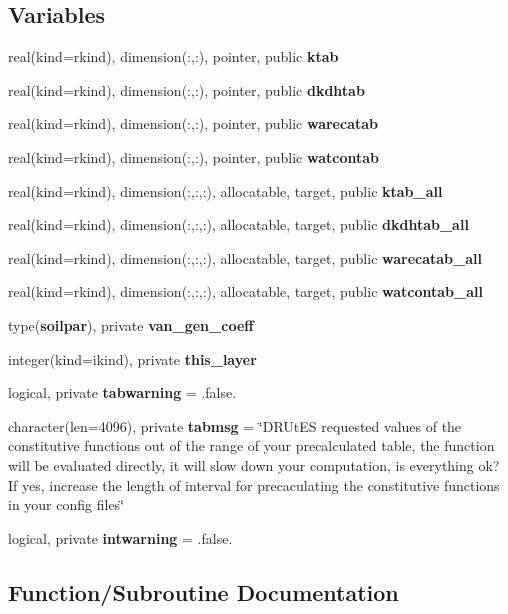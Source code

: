 \subsection*{Variables}
\begin{DoxyCompactItemize}
\item 
real(kind=rkind), dimension(\+:,\+:), pointer, public {\bf ktab}
\item 
real(kind=rkind), dimension(\+:,\+:), pointer, public {\bf dkdhtab}
\item 
real(kind=rkind), dimension(\+:,\+:), pointer, public {\bf warecatab}
\item 
real(kind=rkind), dimension(\+:,\+:), pointer, public {\bf watcontab}
\item 
real(kind=rkind), dimension(\+:,\+:,\+:), allocatable, target, public {\bf ktab\+\_\+all}
\item 
real(kind=rkind), dimension(\+:,\+:,\+:), allocatable, target, public {\bf dkdhtab\+\_\+all}
\item 
real(kind=rkind), dimension(\+:,\+:,\+:), allocatable, target, public {\bf warecatab\+\_\+all}
\item 
real(kind=rkind), dimension(\+:,\+:,\+:), allocatable, target, public {\bf watcontab\+\_\+all}
\item 
type({\bf soilpar}), private {\bf van\+\_\+gen\+\_\+coeff}
\item 
integer(kind=ikind), private {\bf this\+\_\+layer}
\item 
logical, private {\bf tabwarning} = .false.
\item 
character(len=4096), private {\bf tabmsg} = \char`\"{}D\+R\+Ut\+ES requested values of the constitutive functions out of the range of your precalculated table, the function will be evaluated directly, it will slow down your computation, is everything ok? If yes, increase the length of interval for precaculating the constitutive functions in your config files\char`\"{}
\item 
logical, private {\bf intwarning} = .false.
\end{DoxyCompactItemize}


\subsection{Function/\+Subroutine Documentation}

